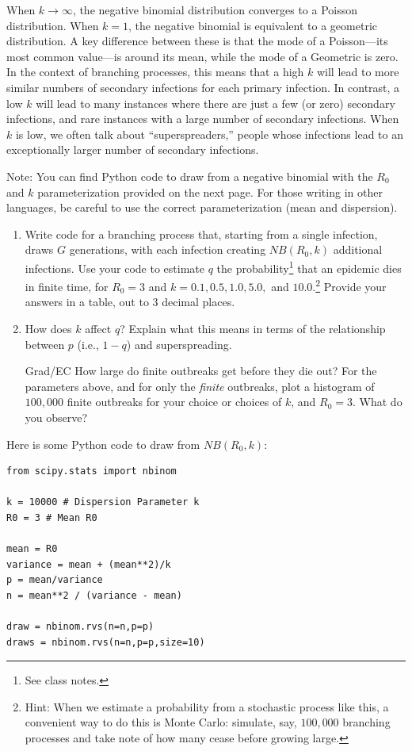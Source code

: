 \documentclass[11pt]{article}
\begin{document}
\begin{enumerate}
When $k \to \infty$, the negative binomial distribution converges to a Poisson distribution. When $k = 1$, the negative binomial is equivalent to a geometric distribution. A key difference between these is that the mode of a Poisson---its most common value---is around its mean, while the mode of a Geometric is zero. In the context of branching processes, this means that a high $k$ will lead to more similar numbers of secondary infections for each primary infection. In contrast, a low $k$ will lead to many instances where there are just a few (or zero) secondary infections, and rare instances with a large number of secondary infections. When $k$ is low, we often talk about ``superspreaders,'' people whose infections lead to an exceptionally larger number of secondary infections. 

Note: You can find Python code to draw from a negative binomial with the $R_0$ and $k$ parameterization provided on the next page. For those writing in other languages, be careful to use the correct parameterization (mean and dispersion).

\begin{enumerate}[label=\alph*.]
	\item Write code for a branching process that, starting from a single infection, draws $G$ generations, with each infection creating $NB(R_0,k)$ additional infections. Use your code to estimate $q$ the probability\footnote{See class notes.} that an epidemic dies in finite time, for $R_0=3$ and $k=0.1, 0.5, 1.0, 5.0,$ and $10.0$.\footnote{Hint: When we estimate a probability from a stochastic process like this, a convenient way to do this is Monte Carlo: simulate, say, $100,000$ branching processes and take note of how many cease before growing large.} Provide your answers in a table, out to 3 decimal places.
	\item How does $k$ affect $q$? Explain what this means in terms of the relationship between $p$ (i.e., $1-q$) and superspreading. 
	\item [Grad/EC] How large do finite outbreaks get before they die out? For the parameters above, and for only the {\it finite} outbreaks, plot a histogram of $100,000$ finite outbreaks for your choice or choices of $k$, and $R_0=3$. What do you observe? 
\end{enumerate}

\clearpage
Here is some Python code to draw from $NB(R_0, k)$:
\begin{verbatim}
from scipy.stats import nbinom

k = 10000 # Dispersion Parameter k
R0 = 3 # Mean R0

mean = R0
variance = mean + (mean**2)/k
p = mean/variance
n = mean**2 / (variance - mean) 

draw = nbinom.rvs(n=n,p=p)
draws = nbinom.rvs(n=n,p=p,size=10)
\end{verbatim}



\end{enumerate}
\end{document}
